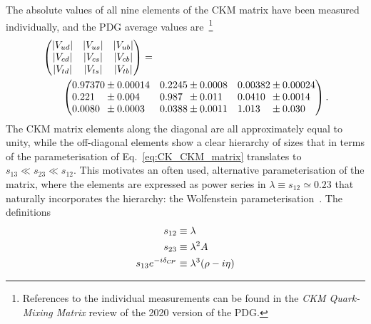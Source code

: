 The absolute values of all nine elements of the CKM matrix have been measured individually, and the PDG average values are~\cite{PDG2020}\footnote{References to the individual measurements can be found in the \emph{CKM Quark-Mixing Matrix} review of the 2020 version of the PDG.}
\begin{align}
    &\begin{pmatrix}
        |V_{ud}| & 
        |V_{us}| & 
        |V_{ub}| \\
        |V_{cd}| & 
        |V_{cs}| & 
        |V_{cb}| \\
        |V_{td}| & 
        |V_{ts}| & 
        |V_{tb}| 
    \end{pmatrix} =\notag\\
    &\qquad\begin{pmatrix}
        0.97370             \pm 0.00014             &  %
        0.2245              \pm 0.0008              &  %
        0.00382             \pm 0.00024             \\ %
        0.221\phantom{00}   \pm 0.004\phantom{00}   &  %
        0.987\phantom{0}    \pm 0.011\phantom{0}    &  %
        0.0410\phantom{0}   \pm 0.0014\phantom{0}   \\ %
        0.0080\phantom{0}   \pm 0.0003\phantom{0}   &  %
        0.0388              \pm 0.0011              &  %
        1.013\phantom{00}   \pm 0.030\phantom{00}  %
    \end{pmatrix}.
\end{align}
The CKM matrix elements along the diagonal are all approximately equal to unity, while the off-diagonal elements show a clear hierarchy of sizes that in terms of the parameterisation of Eq.~\eqref{eq:CK_CKM_matrix} translates to $s_{13}\ll s_{23} \ll s_{12}$. This motivates an often used, alternative parameterisation of the matrix, where the elements are expressed as power series in $\lambda\equiv s_{12}\simeq 0.23$ that naturally incorporates the hierarchy: the Wolfenstein parameterisation~\cite{wolfensteinParametrizationKobayashiMaskawaMatrix1983}. The definitions
\begin{align}
    \begin{split}
         s_{12} &\equiv \lambda \\
         s_{23} &\equiv \lambda^2A \\
         s_{13} e^{-i\delta_{C\!P}}&\equiv \lambda^3(\rho - i \eta) \\
    \end{split}
\end{align}
